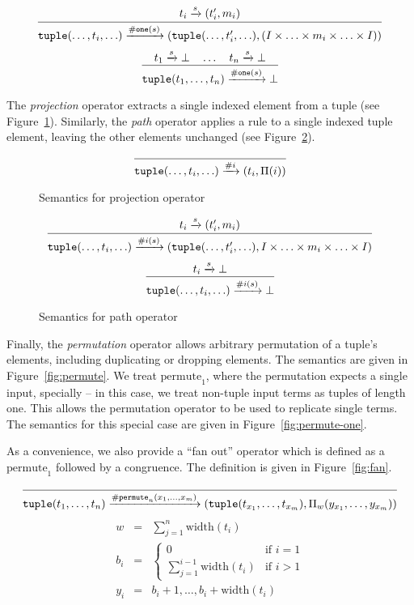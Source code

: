 \begin{figure*}[ht]
\[
\infer
  {\mathtt{tuple}(\ldots,t_i,\ldots) \arr{\mathtt{\#one}(s)} (\mathtt{tuple}(\ldots,t_i',\ldots),(I \times \ldots \times m_i \times \ldots \times I))}
  {t_i \arr{s} (t_i',m_i)}
\]
\[
\infer
  {\mathtt{tuple}(t_1,\ldots,t_n) \arr{\mathtt{\#one}(s)} \bot}
  {t_1 \arr{s} \bot \quad \ldots \quad t_n \arr{s} \bot}
\]
\caption{Semantics for branch-one operator}
\label{fig:branch}
\end{figure*}

The \emph{projection} operator extracts a single indexed element
from a tuple (see Figure~\ref{fig:projection}). Similarly, the
\emph{path} operator applies a rule to a single indexed tuple
element, leaving the other elements unchanged (see
Figure~\ref{fig:path}).

\begin{figure}[ht]
\[
\infer
  {\mathtt{tuple}(\ldots,t_i,\ldots) \arr{\#i} (t_i,\Pi(i))}
  {}
\]
\caption{Semantics for projection operator}
\label{fig:projection}
\end{figure}

\begin{figure}[ht]
\[
\infer
  {\mathtt{tuple}(\ldots,t_i,\ldots) \arr{\#i(s)} (\mathtt{tuple}(\ldots,t_i',\ldots), I \times \ldots \times m_i \times \ldots \times I)}
  {t_i \arr{s} (t_i',m_i)}
\]
\[
\infer
  {\mathtt{tuple}(\ldots,t_i,\ldots) \arr{\#i(s)} \bot}
  {t_i \arr{s} \bot}
\]
\caption{Semantics for path operator}
\label{fig:path}
\end{figure}

Finally, the \emph{permutation} operator allows arbitrary
permutation of a tuple's elements, including duplicating or
dropping elements. The semantics are given in
Figure~\ref{fig:permute}. We treat $\mbox{permute}_1$, where the
permutation expects a single input, specially -- in this case, we
treat non-tuple input terms as tuples of length one. This allows
the permutation operator to be used to replicate single terms. The
semantics for this special case are given in
Figure~\ref{fig:permute-one}.

As a convenience, we also provide a ``fan out'' operator which is
defined as a $\mbox{permute}_1$ followed by a congruence. The
definition is given in Figure~\ref{fig:fan}.

\begin{figure*}[htb]
\[
\infer
  {\mathtt{tuple}(t_1,\ldots,t_n) \arr{\mathtt{\#permute}_n(x_1,\ldots,x_m)} (\mathtt{tuple}(t_{x_1},\ldots,t_{x_m}),\Pi_w(y_{x_1},\ldots,y_{x_m}))}
  {}
\]
\begin{eqnarray*}
w   &=& \sum_{j=1}^n \mbox{width}(t_i)\\
b_i &=& \left\{
  \begin{array}{cl}
    0 & \mbox{if } i = 1\\
    \sum_{j=1}^{i-1} \mbox{width}(t_i) & \mbox{if } i > 1
  \end{array}
\right.\\
y_i &=& b_i+1,\ldots,b_i + \mbox{width}(t_i)
\end{eqnarray*}
\caption{Semantics for permutation operator}
\label{fig:permute}
\end{figure*}


